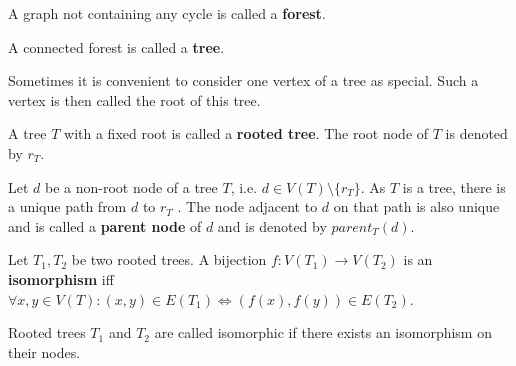 \begin{definition}
  A graph not containing any cycle is called a {\bf forest}.
\end{definition}

\begin{definition}
  A connected forest is called a  {\bf tree}.
\end{definition}

Sometimes it is convenient to consider one vertex of a tree as special. Such a vertex is then called the root of this tree.

\begin{definition}
  A tree $T$ with a fixed root is called a  {\bf rooted tree}. The root node of $T$ is denoted by $r_T$.
\end{definition}

\begin{definition}
  Let $d$ be a non-root node of a tree $T$, i.e. $d\in V(T)\setminus \{r_T\}$. As $T$ is a tree, there is a unique path from $d$ to $r_T$ \cite{Diestel97Graphs}. The node adjacent to $d$ on that path is also unique and is called a {\bf parent node} of $d$ and is denoted by $parent_T(d)$.
\end{definition}

\begin{definition}
  Let $T_1, T_2$ be two rooted trees. A bijection $f: V(T_1)\rightarrow V(T_2)$ is an  {\bf isomorphism} iff $\forall x,y\in V(T): (x,y)\in E(T_1)\Leftrightarrow (f(x), f(y))\in E(T_2)$.
\end{definition}

Rooted trees $T_1$ and $T_2$ are called isomorphic if there exists an isomorphism on their nodes.
